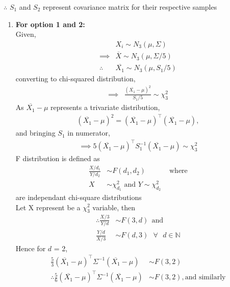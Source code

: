 \documentclass[journal,12pt,twocolumn]{IEEEtran}
\theoremstyle{remark}
\begin{document}
$\therefore$ $S_1$ and $S_2$ represent covariance matrix for their respective samples\\
\begin{enumerate}
	\item \textbf{For option 1 and 2:}\\
Given,
\begin{align}
	&X_i \sim N_3(\mu,\Sigma)\\
	\implies &\overline{X} \sim N_3(\mu, \Sigma/5)\\
	\therefore &\overline{X_1} \sim N_3(\mu,S_1/5)
\end{align}
converting to chi-squared distribution,
\begin{align}
	\implies &\frac{(\overline{X_1} - \mu)^2}{S_1/5} \sim \chi^2_3
\end{align}
As $\overline{X_1}-\mu$ represents a trivariate distribution, 
\begin{align}
	(\overline{X_1}-\mu)^2 = (\overline{X_1}-\mu)^{\top}(\overline{X_1}-\mu),
\end{align}
and bringing $S_1$ in numerator,
\begin{align}
	\implies 5(\overline{X_1}-\mu)^{\top}S_1^{-1}(\overline{X_1}-\mu) \sim \chi^2_3
\end{align}
F distribution is defined as 
\begin{align}
	\frac{X/d_1}{Y/d_2} &\sim F(d_1,d_2) &\text{ where}\\
	X &\sim \chi^2_{d_1} \text{ and } Y \sim \chi^2_{d_2}
\end{align}
are independant chi-square distributions\\
Let X represent be a $\chi^2_3$ variable, then
\begin{align}
	\therefore \frac{X/3}{Y/d} &\sim F(3,d) \ \  \text{and}\\
	 \frac{Y/d}{X/3} &\sim F(d,3) \ \ \ \forall\ \ \  d \in \mathbb{N}
\end{align}
Hence for $d$ = 2,
\begin{align}
	\frac{5}{3}(\overline{X_1}-\mu)^{\top}\Sigma^{-1}(\overline{X_1}-\mu) &\sim F(3,2)\\
	\therefore \frac{5}{6}(\overline{X_1}-\mu)^{\top}\Sigma^{-1}(\overline{X_1}-\mu) &\sim F(3,2), \text{and similarly}\\

\end{align}
\end{enumerate}
\end{document}
